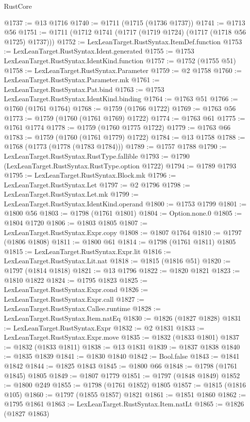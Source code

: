 \begin{lexlean}{RustCore}
\begin{coremodule}
@1737 := @13 @1716
@1740 := @1711 (@1715 (@1736 @1737))
@1741 := @1713 @56
@1751 := @1711 (@1712 @1741 (@1717 (@1719 @1724) (@1717 (@1718 @56 @1725) @1737)))
@1752 := LexLeanTarget.RustSyntax.ItemDef.function
@1753 := LexLeanTarget.RustSyntax.Ident.generated
@1755 := @1753 LexLeanTarget.RustSyntax.IdentKind.function
@1757 := @1752 (@1755 @51)
@1758 := LexLeanTarget.RustSyntax.Parameter
@1759 := @2 @1758
@1760 := LexLeanTarget.RustSyntax.Parameter.mk
@1761 := LexLeanTarget.RustSyntax.Pat.bind
@1763 := @1753 LexLeanTarget.RustSyntax.IdentKind.binding
@1764 := @1763 @51
@1766 := @1760 (@1761 @1764)
@1768 := @1759 (@1766 @1722)
@1769 := @1763 @56
@1773 := @1759 (@1760 (@1761 @1769) @1722)
@1774 := @1763 @61
@1775 := @1761 @1774
@1778 := @1759 (@1760 @1775 @1722)
@1779 := @1763 @66
@1783 := @1759 (@1760 (@1761 @1779) @1722)
@1784 := @13 @1758
@1788 := @1768 (@1773 (@1778 (@1783 @1784)))
@1789 := @1757 @1788
@1790 := LexLeanTarget.RustSyntax.RustType.fallible
@1793 := @1790 (LexLeanTarget.RustSyntax.RustType.option @1722)
@1794 := @1789 @1793
@1795 := LexLeanTarget.RustSyntax.Block.mk
@1796 := LexLeanTarget.RustSyntax.Let
@1797 := @2 @1796
@1798 := LexLeanTarget.RustSyntax.Let.mk
@1799 := LexLeanTarget.RustSyntax.IdentKind.operand
@1800 := @1753 @1799
@1801 := @1800 @56
@1803 := @1798 (@1761 @1801)
@1804 := Option.none.{0}
@1805 := @1804 @1720
@1806 := @1803 @1805
@1807 := LexLeanTarget.RustSyntax.Expr.copy
@1808 := @1807 @1764
@1810 := @1797 (@1806 @1808)
@1811 := @1800 @61
@1814 := @1798 (@1761 @1811) @1805
@1815 := LexLeanTarget.RustSyntax.Expr.lit
@1816 := LexLeanTarget.RustSyntax.Lit.nat
@1818 := @1815 (@1816 @51)
@1820 := @1797 (@1814 @1818)
@1821 := @13 @1796
@1822 := @1820 @1821
@1823 := @1810 @1822
@1824 := @1795 @1823
@1825 := LexLeanTarget.RustSyntax.Expr.cond
@1826 := LexLeanTarget.RustSyntax.Expr.call
@1827 := LexLeanTarget.RustSyntax.Callee.runtime
@1828 := LexLeanTarget.RustSyntax.Item.natEq
@1830 := @1826 (@1827 @1828)
@1831 := LexLeanTarget.RustSyntax.Expr
@1832 := @2 @1831
@1833 := LexLeanTarget.RustSyntax.Expr.move
@1835 := @1832 (@1833 @1801)
@1837 := @1832 (@1833 @1811)
@1838 := @13 @1831
@1839 := @1837 @1838
@1840 := @1835 @1839
@1841 := @1830 @1840
@1842 := Bool.false
@1843 := @1841 @1842
@1844 := @1825 @1843
@1845 := @1800 @66
@1848 := @1798 (@1761 @1845) @1805
@1849 := @1807 @1779
@1851 := @1797 (@1848 @1849)
@1852 := @1800 @249
@1855 := @1798 (@1761 @1852) @1805
@1857 := @1815 (@1816 @105)
@1860 := @1797 (@1855 @1857) @1821
@1861 := @1851 @1860
@1862 := @1795 @1861
@1863 := LexLeanTarget.RustSyntax.Item.natLt
@1865 := @1826 (@1827 @1863)

\end{coremodule}
\end{lexlean}
